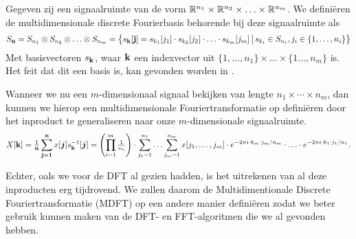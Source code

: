 \begin{definitie} 
Gegeven zij een signaalruimte van de vorm
$\mathbb{R}^{n_1} \times \mathbb{R}^{n_2} \times \ldots \times \mathbb{R}^{n_m}$.
We defini\"eren de multidimensionale discrete Fourierbasis behorende bij deze signaalruimte als
\[
  S_{\bold n}= S_{n_1}\otimes S_{n_2} \otimes \ldots \otimes S_{n_m} = 
  \left\{s_{\bold k}[{\bold j}]  = s_{k_1}[j_1]\cdot s_{k_2}[j_2]\cdot\ldots\cdot s_{k_m}[j_m] 
  \,\big|\, s_{k_i} \in S_{n_i}, j_i \in \{1,\ldots, n_i\} \right\}
\]
Met basisvectoren $s_{\bold k}$, waar $\bold k$ een indexvector uit $\{1, \ldots, n_1\}\times\ldots\times\{1\ldots, n_m\}$ is.
Het feit dat dit een basis is, kan gevonden worden in \cite{topo}.
\end{definitie}

Wanneer we nu een $m$-dimensionaal signaal bekijken van lengte $n_1 \times \cdots \times n_m$, dan kunnen we
hierop een multidimensionale Fouriertransformatie op defini\"eren door het inproduct te generaliseren naar 
onze $m$-dimensionale signaalruimte.
\begin{equation}
  \label{algemeen_fourier_schema}
  X[\bold k] = \tfrac{1}{\bold n}
  \sum_{\bold j = \bold 1}^{\bold n} x[\boldsymbol j] s^{-1}_{\bold k}[\boldsymbol j] 
  =
  \left(\prod_{i=1}^m \tfrac{1}{n_i}\right) \cdot 
  \sum_{j_1=1}^{n_1} \ldots \sum_{j_m=1}^{n_m} 
  x[j_1,\ldots,j_m] \cdot 
  e^{-{2\pi i}\cdot k_m \cdot j_m /n_m } \cdot \ldots \cdot e^{-{2\pi i}\cdot k_1 \cdot j_1 /n_1 }.
\end{equation}

Echter, oals we voor de DFT al gezien hadden, is het uitrekenen van al deze inproducten erg tijdrovend.
We zullen daarom de Multidimentionale Discrete Fouriertransformatie (MDFT) op een andere manier defini\"eren 
zodat we beter gebruik kunnen maken van de DFT- en FFT-algoritmen die we al gevonden hebben.

